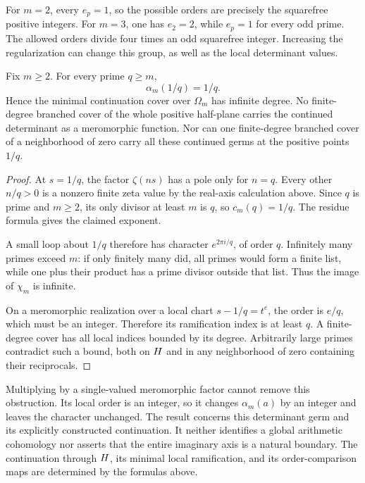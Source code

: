 For \(m=2\), every \(e_p=1\), so the possible orders are precisely
the squarefree positive integers.  For \(m=3\), one has \(e_2=2\),
while \(e_p=1\) for every odd prime.  The allowed orders divide four
times an odd squarefree integer.  Increasing the regularization can change
this group, as well as the local determinant values.

\begin{theorem}
\label{thm:infinite-degree}
Fix \(m\geq2\).  For every prime \(q\geq m\),
\[
 \alpha_m(1/q)=1/q.
\]
Hence the minimal continuation cover over \(\Omega_m\) has infinite
degree.  No finite-degree branched cover of the whole positive half-plane
carries the continued determinant as a meromorphic function.
Nor can one finite-degree branched cover of a neighborhood of zero carry
all these continued germs at the positive points \(1/q\).
\end{theorem}

\begin{proof}
At \(s=1/q\), the factor \(\zeta(ns)\) has a pole only for \(n=q\).
Every other \(n/q>0\) is a nonzero finite zeta value by the real-axis
calculation above.  Since \(q\) is prime and \(m\geq2\), its only
divisor at least \(m\) is \(q\), so \(c_m(q)=1/q\).
The residue formula gives the claimed exponent.

A small loop about \(1/q\) therefore has character
\(e^{2\pi i/q}\), of order \(q\).  Infinitely many primes exceed \(m\):
if only finitely many did, all primes would form a finite list, while
one plus their product has a prime divisor outside that list.
Thus the image of \(\chi_m\) is infinite.

On a meromorphic realization over a local chart
\(s-1/q=t^e\), the order is \(e/q\), which must be an integer.
Therefore its ramification index is at least \(q\).
A finite-degree cover has all local indices bounded by its degree.
Arbitrarily large primes contradict such a bound, both on \(H\)
and in any neighborhood of zero containing their reciprocals.
\end{proof}

Multiplying by a single-valued meromorphic factor cannot remove this
obstruction.  Its local order is an integer, so it changes
\(\alpha_m(a)\) by an integer and leaves the character unchanged.
The result concerns this determinant germ and its explicitly constructed
continuation.  It neither identifies a global arithmetic cohomology nor
asserts that the entire imaginary axis is a natural boundary.
The continuation through \(H\), its minimal local ramification,
and its order-comparison maps are determined by the formulas above.

